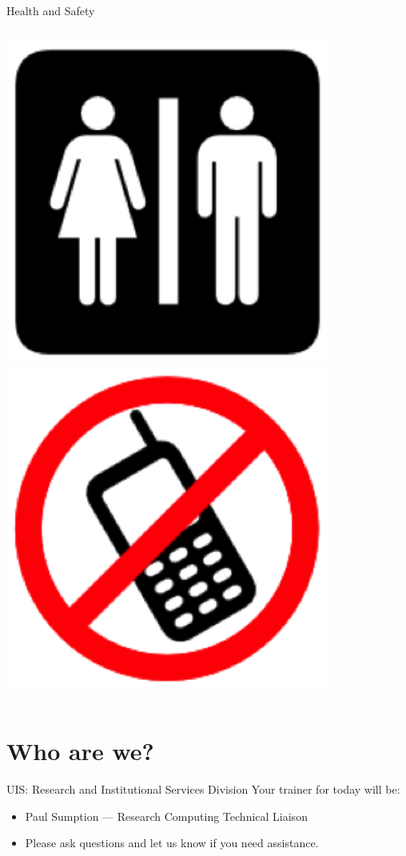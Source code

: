 \begin{frame}{Health and Safety}
\begin{columns}[c]
\begin{column}{0.33\textwidth}
\begin{center}
\includegraphics[width=0.8\textwidth,height=0.5\textheight,keepaspectratio]{imgs/health-safety-3.png}\\
\includegraphics[width=0.8\textwidth,height=0.5\textheight,keepaspectratio]{imgs/health-safety-6.png}
\end{center}
\end{column}
\end{columns}
\end{frame}

\section{Who are we?}
\begin{frame}{UIS: Research and Institutional Services Division}
Your trainer for today will be:\\
\begin{itemize}
  \item Paul Sumption --- Research Computing Technical Liaison
  \item\alert{Please ask questions and let us know if you need assistance.}
\end{itemize}
\end{frame}


